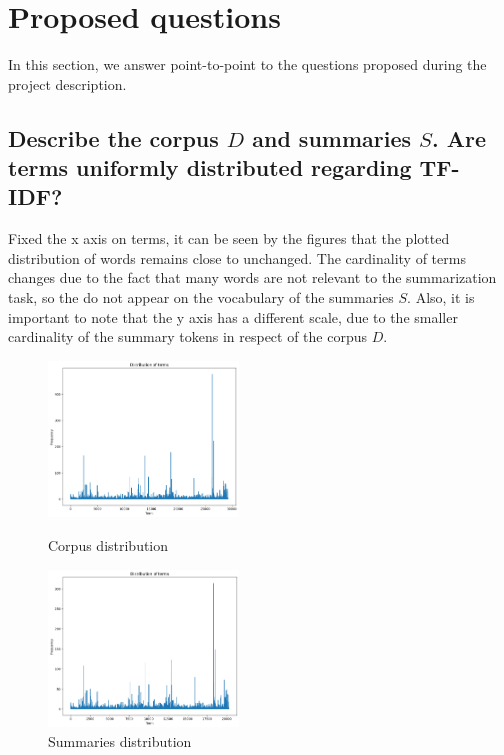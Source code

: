 \section{Proposed questions}
In this section, we answer point-to-point to the questions proposed during the project description.

\subsection{Describe the corpus $D$ and summaries $S$. Are terms uniformly distributed regarding TF-IDF?}
Fixed the x axis on terms, it can be seen by the figures that the plotted
distribution of words remains close to unchanged. The cardinality of terms changes due to the fact that many words are not relevant to the summarization task, so the do not appear on the vocabulary of the summaries $S$. Also, it is important to
note that the y axis has a different scale, due to the smaller cardinality of the summary tokens in respect of the corpus $D$.
\begin{figure}[h]
    \centering
    \includegraphics[width=0.45\textwidth]{images/dist_D.png}
    \caption{Corpus distribution}
    \label{fig:Corpus}
    \includegraphics*[width=0.45\textwidth]{images/dist_S.png}
    \caption{Summaries distribution}
    \label{fig:Summaries}
\end{figure}

\newpage

